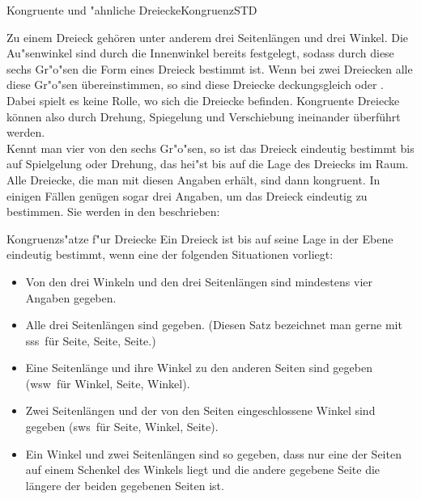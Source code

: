 \begin{MXContent}{Kongruente und "ahnliche Dreiecke}{Kongruenz}{STD}

Zu einem Dreieck geh\"oren unter anderem drei Seitenl\"angen und drei Winkel. 
Die Au"senwinkel sind durch die Innenwinkel bereits festgelegt, sodass durch 
diese sechs Gr"o"sen die {\glqq}Form{\grqq} eines Dreieck bestimmt ist. Wenn 
bei zwei Dreiecken alle diese Gr"o"sen \"ubereinstimmen, so sind diese Dreiecke 
deckungsgleich oder . 
Dabei spielt es keine 
Rolle, wo sich die Dreiecke befinden. Kongruente Dreiecke k\"onnen also durch 
Drehung, Spiegelung und Verschiebung ineinander \"uberf\"uhrt werden.\\
Kennt man vier von den sechs Gr"o"sen, so ist das Dreieck eindeutig bestimmt 
bis auf Spielgelung oder Drehung, das hei"st bis auf die Lage des Dreiecks 
im Raum. Alle Dreiecke, die man mit diesen Angaben erh\"alt, sind dann kongruent.
In einigen F\"allen gen\"ugen sogar drei Angaben, um das Dreieck eindeutig 
zu bestimmen.
Sie werden in den  
beschrieben:

\begin{MXInfo}{Kongruenzs"atze f"ur Dreiecke}%
%
Ein Dreieck ist bis auf seine Lage in der Ebene eindeutig bestimmt, wenn 
eine der folgenden Situationen vorliegt:
\begin{itemize}
 \item Von den drei Winkeln und den drei Seitenl\"angen sind
       mindestens vier Angaben gegeben.
 
 \item Alle drei Seitenl\"angen sind gegeben.
       (Diesen Satz bezeichnet man gerne mit \glqq sss\grqq\ f\"ur \glqq Seite, Seite, Seite\grqq.)
 
 \item Eine Seitenl\"ange und ihre Winkel zu den anderen Seiten sind gegeben
       (\glqq wsw\grqq\ f\"ur \glqq Winkel, Seite, Winkel\grqq).
        
 \item Zwei Seitenl\"angen und der von den Seiten eingeschlossene Winkel 
       sind gegeben (\glqq sws\grqq\ f\"ur \glqq Seite, Winkel, Seite\grqq).
       
             
 \item Ein Winkel und zwei Seitenl\"angen sind so gegeben, dass nur eine der 
       Seiten auf einem Schenkel des Winkels liegt und die andere gegebene 
       Seite die l\"angere der beiden gegebenen Seiten ist.


\end{itemize}
\end{MXInfo}
\end{MXContent}
